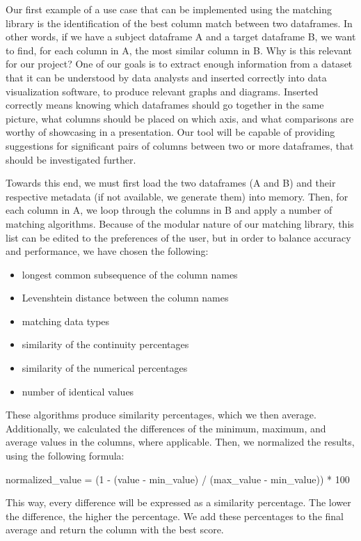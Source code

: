 Our first example of a use case that can be implemented using the matching library is the identification of the best column
match between two dataframes.
In other words, if we have a subject dataframe A and a target dataframe B, we want to find, for each column in A, the most
similar column in B\@.
Why is this relevant for our project?
One of our goals is to extract enough information from a dataset that it can be understood by data analysts and inserted
correctly into data visualization software, to produce relevant graphs and diagrams.
Inserted correctly means knowing which dataframes should go together in the same picture, what columns should be placed
on which axis, and what comparisons are worthy of showcasing in a presentation.
Our tool will be capable of providing suggestions for significant pairs of columns between two or more dataframes, that
should be investigated further.

Towards this end, we must first load the two dataframes (A and B) and their respective metadata (if not available, we generate
them) into memory.
Then, for each column in A, we loop through the columns in B and apply a number of matching algorithms.
Because of the modular nature of our matching library, this list can be edited to the preferences of the user, but in order
to balance accuracy and performance, we have chosen the following:

\begin{itemize}
    \item longest common subsequence of the column names
    \item Levenshtein distance between the column names
    \item matching data types
    \item similarity of the continuity percentages
    \item similarity of the numerical percentages
    \item number of identical values
\end{itemize}

These algorithms produce similarity percentages, which we then average.
Additionally, we calculated the differences of the minimum, maximum, and average values in the columns, where applicable.
Then, we normalized the results, using the following formula:

normalized\_value = (1 - (value - min\_value) / (max\_value - min\_value)) * 100

This way, every difference will be expressed as a similarity percentage.
The lower the difference, the higher the percentage.
We add these percentages to the final average and return the column with the best score.

